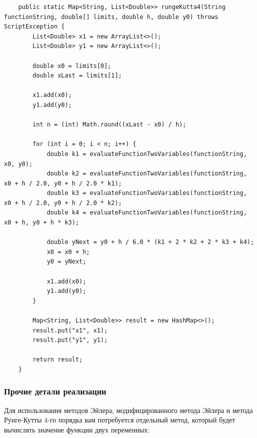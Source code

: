 \documentclass[12pt]{article}
\begin{document}
    \begin{verbatim}
    public static Map<String, List<Double>> rungeKutta4(String functionString, double[] limits, double h, double y0) throws ScriptException {
        List<Double> x1 = new ArrayList<>();
        List<Double> y1 = new ArrayList<>();

        double x0 = limits[0];
        double xLast = limits[1];

        x1.add(x0);
        y1.add(y0);

        int n = (int) Math.round((xLast - x0) / h);

        for (int i = 0; i < n; i++) {
            double k1 = evaluateFunctionTwoVariables(functionString, x0, y0);
            double k2 = evaluateFunctionTwoVariables(functionString, x0 + h / 2.0, y0 + h / 2.0 * k1);
            double k3 = evaluateFunctionTwoVariables(functionString, x0 + h / 2.0, y0 + h / 2.0 * k2);
            double k4 = evaluateFunctionTwoVariables(functionString, x0 + h, y0 + h * k3);

            double yNext = y0 + h / 6.0 * (k1 + 2 * k2 + 2 * k3 + k4);
            x0 = x0 + h;
            y0 = yNext;

            x1.add(x0);
            y1.add(y0);
        }

        Map<String, List<Double>> result = new HashMap<>();
        result.put("x1", x1);
        result.put("y1", y1);

        return result;
    }
    \end{verbatim}

    \subsubsection{Прочие детали реализации}

    Для использования методов Эйлера, модифицированного метода Эйлера и метода Рунге-Кутты 4-го порядка вам потребуется отдельный метод, который будет вычислять значение функции двух переменных:
\end{document}
